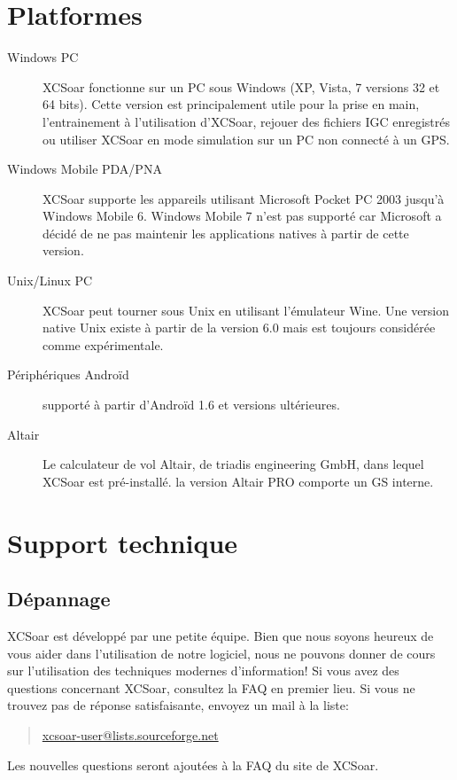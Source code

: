 \section{Platformes}
\begin{description}
\item[Windows PC]
XCSoar fonctionne sur un PC sous Windows (XP, Vista, 7 versions 32 et 64 bits). Cette version est principalement utile pour la prise en main, l'entrainement à l'utilisation d'XCSoar, rejouer des fichiers IGC enregistrés ou utiliser XCSoar en mode simulation sur un PC non connecté à un GPS.
\item[Windows Mobile PDA/PNA]
XCSoar supporte les appareils utilisant Microsoft Pocket PC 2003 jusqu'à Windows Mobile 6. Windows Mobile 7 n'est pas supporté car Microsoft a décidé de ne pas maintenir les applications natives à partir de cette version.  
\item[Unix/Linux PC]
XCSoar peut tourner sous Unix en utilisant l'émulateur Wine. Une version native Unix existe à partir de la version 6.0 mais est toujours considérée comme expérimentale.     
\item[Périphériques Androïd] supporté à partir d'Androïd 1.6 et versions ultérieures.
\item[Altair] Le calculateur de vol Altair, de triadis engineering GmbH, dans lequel XCSoar est pré-installé. la version Altair PRO comporte un GS interne. 
\end{description}



\section{Support technique}

\subsection*{Dépannage}
XCSoar est développé par une petite équipe. Bien que nous soyons heureux de vous aider dans l'utilisation de notre logiciel, nous ne pouvons donner de cours sur l'utilisation des techniques modernes d'information!
Si vous avez des questions concernant XCSoar, consultez la FAQ en premier lieu. Si vous ne trouvez pas de réponse satisfaisante, envoyez un mail à la liste:
\begin{quote}
\href{mailto:xcsoar-user@lists.sourceforge.net}{xcsoar-user@lists.sourceforge.net}
\end{quote}

Les nouvelles questions seront ajoutées à la FAQ du site de XCSoar. 

